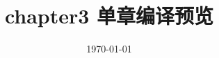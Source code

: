 \documentclass[UTF8,zihao=-4,openany]{ctexbook}
\begin{document}
\frontmatter
\title{chapter3 单章编译预览}
\author{ }
\date{\today}
\maketitle
\tableofcontents
\mainmatter
{}\label{chap:preliminaries}
\setcounter{chapter}{2}

\printbibliography
\end{document}
